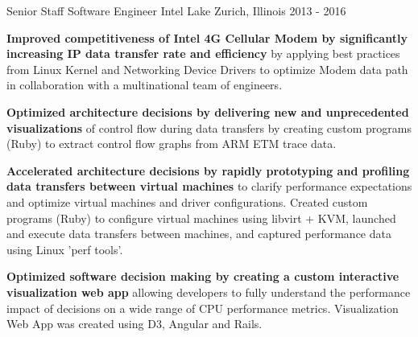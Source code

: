 \begin{cventries}
  \cventry
    {Senior Staff Software Engineer} %
    {Intel} %
    {Lake Zurich, Illinois} %
    {2013 - 2016} %
    {
      \begin{cvitems} %
      \item {\textbf{Improved competitiveness of Intel 4G Cellular Modem by
        significantly increasing IP data transfer rate and efficiency} by
          applying best practices from Linux Kernel and Networking Device
          Drivers to optimize Modem data path in collaboration with a
          multinational team of engineers.}
      \item {\textbf{Optimized architecture decisions by delivering new and
        unprecedented visualizations} of control flow during data transfers
          by creating custom programs (Ruby) to extract control flow graphs from ARM
          ETM trace data.}
        \item {\textbf{Accelerated architecture decisions by rapidly prototyping
          and profiling data transfers between virtual machines} to clarify performance expectations and optimize virtual machines and driver configurations.
          Created custom programs (Ruby) to configure virtual
          machines using libvirt + KVM, launched and execute data transfers between machines, and
          captured performance data using Linux 'perf tools'.}
        \item {\textbf{Optimized software decision making by creating a custom
          interactive visualization web app} allowing developers to fully understand the performance impact of decisions on a wide range of CPU performance metrics.
          Visualization Web App was created using D3, Angular and Rails.}
      \end{cvitems}
    }


\end{cventries}
